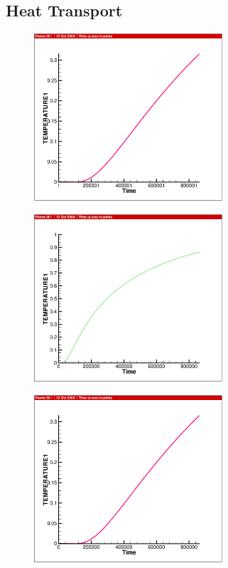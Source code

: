{\newpage
\subsection{Heat Transport}

\begin{figure}[htb!]
  \includegraphics[width=7cm]{figures/ht_line.eps}\\
\end{figure}

\begin{figure}[htb!]
  \includegraphics[width=7cm]{figures/ht_tri.eps}\\
\end{figure}

\begin{figure}[htb!]
  \includegraphics[width=7cm]{figures/ht_quad.eps}\\
\end{figure}

}
